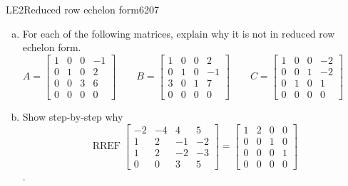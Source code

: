 \begin{exercise}{LE2}{Reduced row echelon form}{6207} 
\begin{exerciseStatement} 

\begin{enumerate}[(a)]
\item  

 For each of the following matrices, explain why it is not in reduced row echelon form. \[
                            A = \left[\begin{array}{cccc}
1 & 0 & 0 & -1 \\
0 & 1 & 0 & 2 \\
0 & 0 & 3 & 6 \\
0 & 0 & 0 & 0
\end{array}\right] \hspace{2em}
                            B = \left[\begin{array}{cccc}
1 & 0 & 0 & 2 \\
0 & 1 & 0 & -1 \\
3 & 0 & 1 & 7 \\
0 & 0 & 0 & 0
\end{array}\right] \hspace{2em}
                            C = \left[\begin{array}{cccc}
1 & 0 & 0 & -2 \\
0 & 0 & 1 & -2 \\
0 & 1 & 0 & 1 \\
0 & 0 & 0 & 0
\end{array}\right] \hspace{2em}
                        \hspace{2em}
                    \] 

 
\item  

 Show step-by-step why \[\operatorname{RREF}\left[\begin{array}{cccc}
-2 & -4 & 4 & 5 \\
1 & 2 & -1 & -2 \\
1 & 2 & -2 & -3 \\
0 & 0 & 3 & 5
\end{array}\right]=\left[\begin{array}{cccc}
1 & 2 & 0 & 0 \\
0 & 0 & 1 & 0 \\
0 & 0 & 0 & 1 \\
0 & 0 & 0 & 0
\end{array}\right]\]. 

 
\end{enumerate}


\end{exerciseStatement}
\end{exercise}
